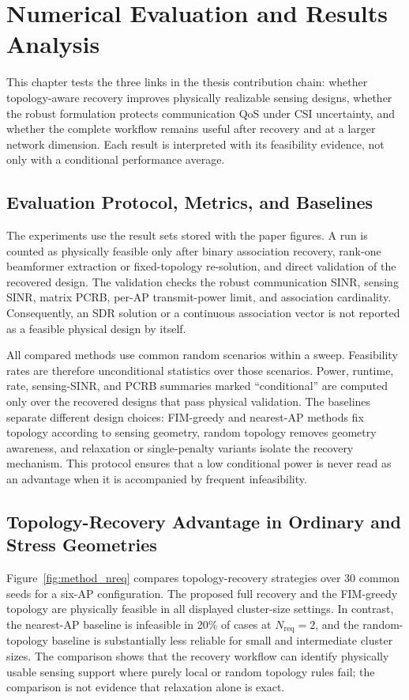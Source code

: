 \chapter{Numerical Evaluation and Results Analysis}\label{ch:results}

This chapter tests the three links in the thesis contribution chain: whether
topology-aware recovery improves physically realizable sensing designs, whether
the robust formulation protects communication QoS under CSI uncertainty, and
whether the complete workflow remains useful after recovery and at a larger
network dimension. Each result is interpreted with its feasibility evidence,
not only with a conditional performance average.

\section{Evaluation Protocol, Metrics, and Baselines}

The experiments use the result sets stored with the paper figures. A run is
counted as physically feasible only after binary association recovery,
rank-one beamformer extraction or fixed-topology re-solution, and direct
validation of the recovered design. The validation checks the robust
communication SINR, sensing SINR, matrix PCRB, per-AP transmit-power limit,
and association cardinality. Consequently, an SDR solution or a continuous
association vector is not reported as a feasible physical design by itself.

All compared methods use common random scenarios within a sweep. Feasibility
rates are therefore unconditional statistics over those scenarios. Power,
runtime, rate, sensing-SINR, and PCRB summaries marked ``conditional'' are
computed only over the recovered designs that pass physical validation. The
baselines separate different design choices: FIM-greedy and nearest-AP methods
fix topology according to sensing geometry, random topology removes geometry
awareness, and relaxation or single-penalty variants isolate the recovery
mechanism. This protocol ensures that a low conditional power is never read as
an advantage when it is accompanied by frequent infeasibility.

\section{Topology-Recovery Advantage in Ordinary and Stress Geometries}

Figure~\ref{fig:method_nreq} compares topology-recovery strategies over 30
common seeds for a six-AP configuration. The proposed full recovery and the
FIM-greedy topology are physically feasible in all displayed cluster-size
settings. In contrast, the nearest-AP baseline is infeasible in 20\% of cases
at $N_{\mathrm{req}}=2$, and the random-topology baseline is substantially
less reliable for small and intermediate cluster sizes. The comparison shows
that the recovery workflow can identify physically usable sensing support where
purely local or random topology rules fail; the comparison is not evidence that
relaxation alone is exact.

